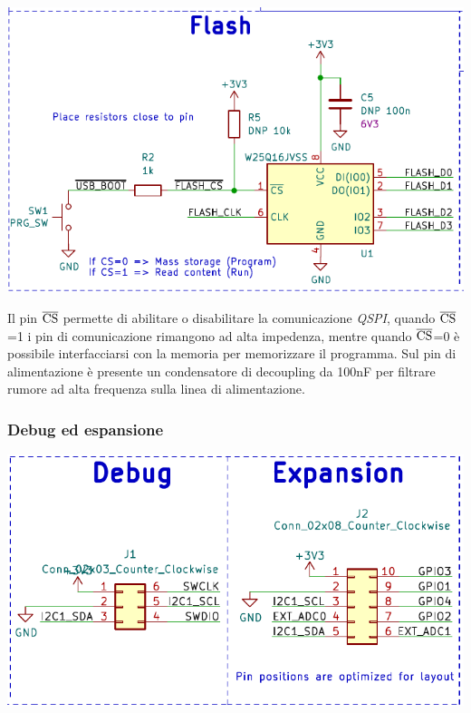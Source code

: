 \begin{center}
\includegraphics[scale=0.9]{figures/image49.png}
\captionsetup{type=figure}
\end{center}

\noindent Il pin $\overline{\rm {CS}}$ permette di abilitare o
disabilitare la comunicazione \emph{QSPI}, quando $\overline{\rm {CS}}$=1 i pin di
comunicazione rimangono ad alta impedenza, mentre quando $\overline{\rm {CS}}$=0 è
possibile interfacciarsi con la memoria per memorizzare il programma.
Sul pin di alimentazione è presente un condensatore di decoupling da 100nF per filtrare rumore ad alta
frequenza sulla linea di alimentazione.

\hypertarget{debug-ed-espansione}{%
\subsubsection{\texorpdfstring{\hfill\break
Debug ed espansione}{ Debug ed espansione}}\label{debug-ed-espansione}}

\begin{center}
\includegraphics[scale=0.8]{figures/image90.png}
\captionsetup{type=figure}
\end{center}

